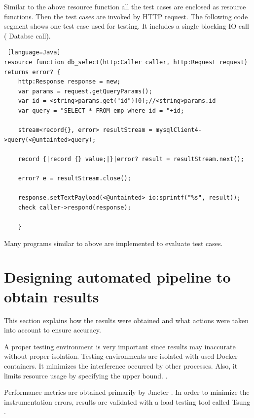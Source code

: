 Similar to the above resource function all the test cases are enclosed as resource functions. Then the test cases are invoked by HTTP request. The following code segment shows one test case used for testing. It includes a single blocking IO call ( Databse call). 

\begin{lstlisting} [language=Java]
resource function db_select(http:Caller caller, http:Request request) returns error? {
	http:Response response = new;
	var params = request.getQueryParams();
	var id = <string>params.get("id")[0];//<string>params.id
	var query = "SELECT * FROM emp where id = "+id;
	
	stream<record{}, error> resultStream = mysqlClient4->query(<@untainted>query);
	
	record {|record {} value;|}|error? result = resultStream.next();
	
	error? e = resultStream.close();
	
	response.setTextPayload(<@untainted> io:sprintf("%s", result));
	check caller->respond(response);
	
	}
\end{lstlisting}

Many programs similar to above are implemented to evaluate test cases.

\section{Designing automated pipeline to obtain results}

This section explains how the results were obtained and what actions were taken into account to ensure accuracy. 

A proper testing environment is very important since results may inaccurate without proper isolation. Testing environments are isolated with used Docker \cite{docker} containers. It minimizes the interference occurred by other processes. Also, it limits resource usage by specifying the upper bound. . 

Performance metrics are obtained primarily by Jmeter \cite{jmeter}. In order to minimize the instrumentation errors, results are validated with a load testing tool called Tsung \cite{tsung}.

